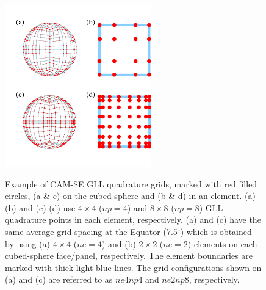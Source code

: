 \documentclass[twocol]{ametsoc}
\begin{document}
\begin{figure}[t]
\noindent\includegraphics[width=15pc,angle=0]{figs/quadrature-fig/gll.pdf}\\
\caption{Example of CAM-SE GLL quadrature grids, marked with red filled circles, (a \& c) on the cubed-sphere and (b \& d) in an element. (a)-(b) and (c)-(d) use $4\times 4$ ($np=4$) and $8\times 8$ ($np=8$) GLL quadrature points in each element, respectively. (a) and (c) have the same average grid-spacing at the Equator (7.5$^\circ$) which is obtained by using (a) $4\times 4$ ($ne=4$) and (b) $2\times 2$ ($ne=2$) elements on each cubed-sphere face/panel, respectively. The element boundaries are marked with thick light blue lines. The grid configurations shown on (a) and (c) are referred to as $ne4np4$ and $ne2np8$, respectively.}
\label{fig:gll-grids}
\end{figure}
\end{document}
